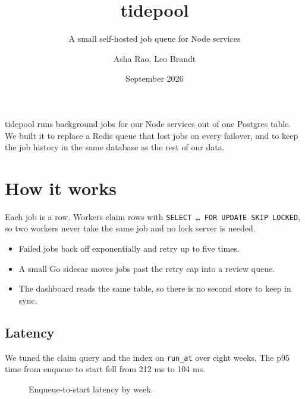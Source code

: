 \documentclass[11pt]{article}
\title{tidepool}
\subtitle{A small self-hosted job queue for Node services}
\author{Asha Rao, Leo Brandt}
\date{September 2026}
\begin{document}
\maketitle

\noindent{}\hfill{}\hfill{}\hfill{}

\bigskip

tidepool runs background jobs for our Node services out of one Postgres table. We built it to replace a Redis queue that lost jobs on every failover, and to keep the job history in the same database as the rest of our data.

\section{How it works}

Each job is a row. Workers claim rows with \texttt{SELECT \dots{} FOR UPDATE SKIP LOCKED}, so two workers never take the same job and no lock server is needed.

\begin{itemize}
  \item Failed jobs back off exponentially and retry up to five times.
  \item A small Go sidecar moves jobs past the retry cap into a review queue.
  \item The dashboard reads the same table, so there is no second store to keep in sync.
\end{itemize}

\subsection{Latency}

We tuned the claim query and the index on \texttt{run\_at} over eight weeks. The p95 time from enqueue to start fell from 212 ms to 104 ms.

\begin{figure}[htbp]
\centering
{}
\caption{Enqueue-to-start latency by week.}
\end{figure}
\end{document}
